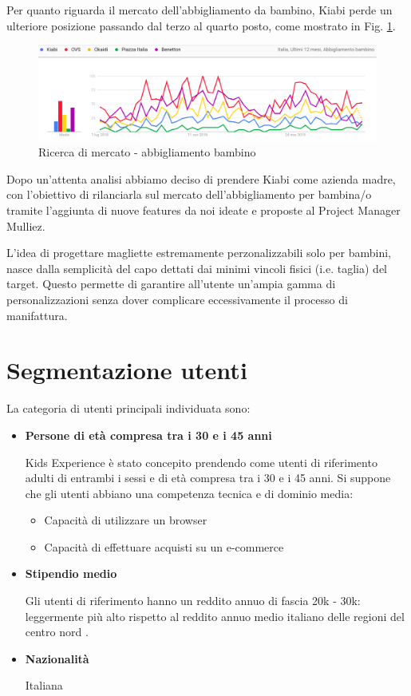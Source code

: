 \documentclass[12pt,italian,]{report}
\providecommand{\tightlist}{%
  \setlength{\itemsep}{0pt}\setlength{\parskip}{0pt}}
\begin{document}
Per quanto riguarda il mercato dell'abbigliamento da bambino, Kiabi perde un ulteriore posizione passando dal terzo al quarto posto, come mostrato in Fig. \ref{abbigliamento_bambino}.

\begin{figure}[h]
\centering
\includegraphics{img/abbigliamento_bambino.png}
\caption{Ricerca di mercato - abbigliamento bambino}
\label{abbigliamento_bambino}
\end{figure}

Dopo un'attenta analisi abbiamo deciso di prendere Kiabi come azienda
madre, con l'obiettivo di rilanciarla sul mercato dell'abbigliamento per
bambina/o tramite l'aggiunta di nuove features da noi ideate e proposte
al Project Manager Mulliez.

L'idea di progettare magliette estremamente perzonalizzabili solo per
bambini, nasce dalla semplicità del capo dettati dai minimi vincoli fisici
(i.e. taglia) del target. Questo permette di garantire all'utente
un'ampia gamma di personalizzazioni senza dover complicare eccessivamente
il processo di manifattura.

\section{Segmentazione utenti}\label{segmentazione_utenti}

La categoria di utenti principali individuata sono:

\begin{itemize}
\item
  \textbf{Persone di età compresa tra i 30 e i 45 anni}

  Kids Experience è stato concepito prendendo come utenti di riferimento
  adulti di entrambi i sessi e di età compresa tra i 30 e i 45 anni. Si
  suppone che gli utenti abbiano una competenza tecnica e di dominio
  media:

  \begin{itemize}
  \tightlist
  \item
    Capacità di utilizzare un browser
  \item
    Capacità di effettuare acquisti su un e-commerce
  \end{itemize}
\item
  \textbf{Stipendio medio}

  Gli utenti di riferimento hanno un reddito annuo di fascia 20k - 30k:
  leggermente più alto rispetto al reddito annuo medio italiano delle
  regioni del centro nord \cite{redditomedio}.
\item
  \textbf{Nazionalità}

  Italiana
\end{itemize}
\end{document}
